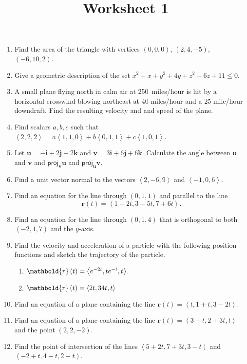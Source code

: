 \documentclass[12pt]{article}
\title{Worksheet 1}
\author{}\date{}
\let\sin\relax\DeclareMathOperator{\sin}{\mathsf{sin}}
\let\arctan\relax\DeclareMathOperator{\arctan}{\mathsf{arctan}}
\let\cos\relax\DeclareMathOperator{\cos}{\mathsf{cos}}
\begin{document}
\maketitle

\begin{enumerate}
\item Find the area of the triangle with vertices
$\left(0,0,0\right)$, $\left(2,4,-5\right)$,
$\left(-6,10,2\right)$. %
\item Give a geometric description of the set
$x^2-x+y^2+4y+z^2-6z+11\le 0$.
\item A small plane flying north in calm air at
250~miles/hour is hit by a horizontal crosswind blowing
northeast at 40 miles/hour and a 25 mile/hour downdraft.
Find the resulting velocity and and speed of the plane.
\item Find scalars $a,b,c$ such that
$\left\langle 2,2,2\right\rangle
=a\left\langle 1,1,0\right\rangle
+b\left\langle 0,1,1\right\rangle
+c\left\langle 1,0,1\right\rangle$.
\item Let $\mathbold{u}=-\mathbold{i}+2\mathbold{j}+2\mathbold{k}$
and $\mathbold{v}=3\mathbold{i}+6\mathbold{j}+6\mathbold{k}$.
Calculate the angle between $\mathbold{u}$ and $\mathbold{v}$
and $\mathsf{proj}_\mathbold{v}\mathbold{u}$
and $\mathsf{proj}_\mathbold{u}\mathbold{v}$.
\item Find a unit vector normal to the vectors
$\left\langle 2,-6,9\right\rangle$ and
$\left\langle -1,0,6\right\rangle$.
\item Find an equation for the line through
$\left(0,1,1\right)$ and parallel to the line
\[\mathbold{r}\left(t\right)=\left\langle
1+2t,3-5t,7+6t\right\rangle.\]
\item Find an equation for the line through
$\left(0,1,4\right)$ that is orthogonal to both
$\left\langle -2,1,7\right)$ and the $y$-axis.
\item Find the velocity and acceleration of
a particle with the following position
functions and sketch the trajectory
of the particle.
\begin{enumerate}
\item $\mathbold{r}\left(t\right)=\left\langle
e^{-2t},te^{-t},\arctan{t}\right\rangle$.
\item $\mathbold{r}\left(t\right)=\left\langle
\sin{2t},3\cos{4t},t\right\rangle$
\end{enumerate}
\item Find an equation of a plane containing the line
$\mathbold{r}\left(t\right)=\left\langle
t,1+t,3-2t\right\rangle$.
\item Find an equation of a plane containing the line
$\mathbold{r}\left(t\right)=\left\langle
3-t,2+3t,t\right\rangle$ and the point $\left(2,2,-2\right)$.
\item Find the point of intersection of the lines
$\left\langle 5+2t,7+3t,3-t\right)$
and $\left\langle -2+t,4-t,2+t\right)$.
\end{enumerate}
\end{document}
